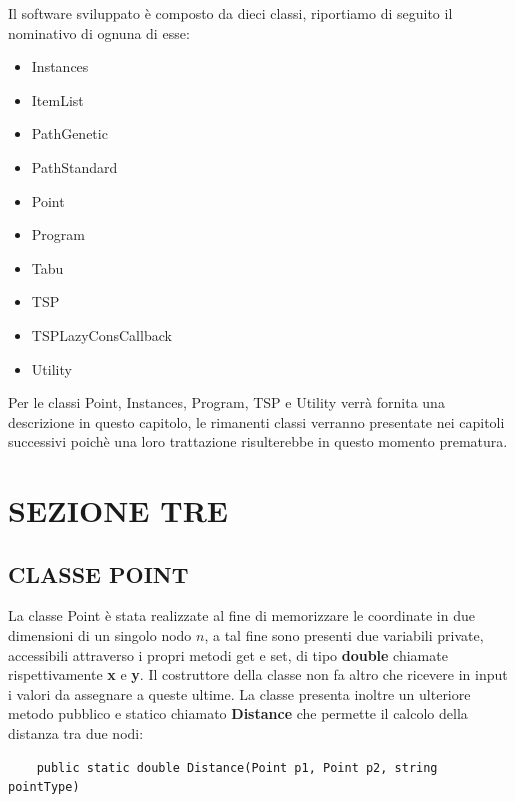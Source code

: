 \documentclass[11pt]{article}
\begin{document}
Il software sviluppato è composto da dieci classi, riportiamo di seguito il nominativo di ognuna di esse:

\begin{itemize}
\item Instances
\item ItemList
\item PathGenetic
\item PathStandard
\item Point
\item Program
\item Tabu
\item TSP
\item TSPLazyConsCallback
\item Utility
\end{itemize}

Per le classi Point, Instances, Program, TSP e Utility verrà fornita una descrizione in questo capitolo, le rimanenti classi verranno presentate nei capitoli successivi poichè una loro trattazione risulterebbe in questo momento prematura. 

\section*{SEZIONE TRE}

\subsection*{CLASSE POINT}

La classe Point è stata realizzate al fine di memorizzare le coordinate in due dimensioni di un singolo nodo $n$, a tal fine sono presenti due variabili private, accessibili attraverso i propri metodi get e set, di tipo \textbf{double} chiamate rispettivamente \textbf{x} e \textbf{y}. Il costruttore della classe non fa altro che ricevere in input i valori da assegnare a queste ultime. La classe presenta inoltre un ulteriore metodo pubblico e statico chiamato \textbf{Distance} che permette il calcolo della distanza tra due nodi:

\begin{lstlisting}
    public static double Distance(Point p1, Point p2, string pointType)
\end{lstlisting}
\end{document}
